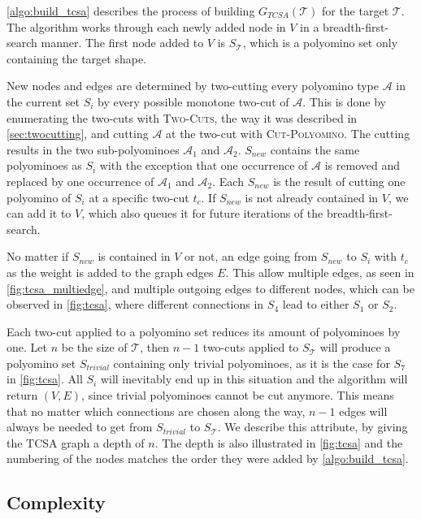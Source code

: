 \autoref{algo:build_tcsa} describes the process of building $G_{\textit{TCSA}}(\mathcal{T})$ for the target $\mathcal{T}$.
The algorithm works through each newly added node in $V$ in a breadth-first-search manner.
The first node added to $V$ is $S_\mathcal{T}$, which is a polyomino set only containing the target shape.

New nodes and edges are determined by two-cutting every polyomino type $\mathcal{A}$ in the current set $S_i$ by every possible monotone two-cut of $\mathcal{A}$.
This is done by enumerating the two-cuts with {\scshape Two-Cuts}, the way it was described in \autoref{sec:twocutting}, and cutting $\mathcal{A}$ at the two-cut with {\scshape Cut-Polyomino}.
The cutting results in the two sub-polyominoes $\mathcal{A}_1$ and $\mathcal{A}_2$.
$S_{new}$ contains the same polyominoes as $S_i$ with the exception that one occurrence of $\mathcal{A}$ is removed and replaced by one occurrence of $\mathcal{A}_1$ and $\mathcal{A}_2$.
Each $S_{new}$ is the result of cutting one polyomino of $S_i$ at a specific two-cut $t_c$.
If $S_{new}$ is not already contained in $V$, we can add it to $V$, which also queues it for future iterations of the breadth-first-search.

No matter if $S_{new}$ is contained in $V$ or not, an edge going from $S_{new}$ to $S_i$ with $t_c$ as the weight is added to the graph edges $E$.
This allow multiple edges, as seen in \autoref{fig:tcsa_multiedge}, and multiple outgoing edges to different nodes, which can be observed in \autoref{fig:tcsa}, where different connections in $S_4$ lead to either $S_1$ or $S_2$.

Each two-cut applied to a polyomino set reduces its amount of polyominoes by one.
Let $n$ be the size of $\mathcal{T}$, then $n-1$ two-cuts applied to $S_\mathcal{T}$ will produce a polyomino set $S_{trivial}$ containing only trivial polyominoes, as it is the case for $S_7$ in \autoref{fig:tcsa}.
All $S_i$ will inevitably end up in this situation and the algorithm will return $(V,E)$, since trivial polyominoes cannot be cut anymore.
This means that no matter which connections are chosen along the way, $n-1$ edges will always be needed to get from $S_{trivial}$ to $S_\mathcal{T}$.
We describe this attribute, by giving the TCSA graph a depth of $n$.
The depth is also illustrated in \autoref{fig:tcsa} and the numbering of the nodes matches the order they were added by \autoref{algo:build_tcsa}.

\subsection{Complexity}

